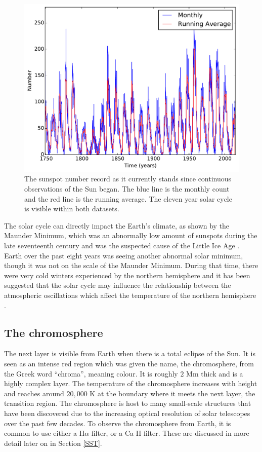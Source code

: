     \begin{figure}
    	\centering
    	\includegraphics[width=\textwidth]{sunspot_number.pdf}
    	\caption{
	    		 The sunspot number record as it currently stands since continuous observations of the Sun began.
	    		 The blue line is the monthly count and the red line is the running average.  
    		     The eleven year solar cycle is visible within both datasets.
    	        }
    	\label{fig:AR_Num}
    \end{figure}   
            
    The solar cycle can directly impact the Earth's climate, as shown by the Maunder Minimum, which was an abnormally low amount of sunspots during the late seventeenth century and was the suspected cause of the Little Ice Age \citep{FRIIS-CHRISTENSEN01111991,climate}.
    Earth over the past eight years was seeing another abnormal solar minimum, though it was not on the scale of the Maunder Minimum.
    During that time, there were very cold winters experienced by the northern hemisphere and it has been suggested that the solar cycle may influence the relationship between the atmospheric oscillations which affect the temperature of the northern hemisphere \citep{CWE,NAO,SCR}. 
   
\subsection{The chromosphere}
\label{chromo}

    The next layer is visible from Earth when there is a total eclipse of the Sun.
    It is seen as an intense red region which was given the name, the chromosphere, from the Greek word ``chroma'', meaning colour.
    It is roughly $2$ Mm thick and is a highly complex layer.
    The temperature of the chromosphere increases with height and reaches around $20,000$ K at the boundary where it meets the next layer, the transition region.    
    The chromosphere is host to many small-scale structures that have been discovered due to the increasing optical resolution of solar telescopes over the past few decades.
    To observe the chromosphere from Earth, it is common to use either a H$\alpha$ filter, or a Ca II filter. 
    These are discussed in more detail later on in Section \ref{SST}. 
        
